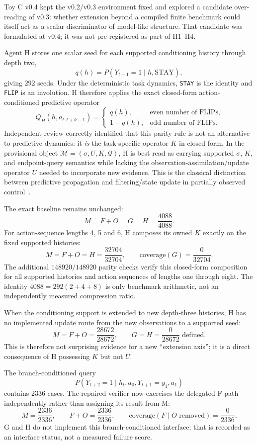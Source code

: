 \documentclass[10pt]{article}
\begin{document}
Toy C v0.4 kept the v0.2/v0.3 environment fixed and explored a candidate over-reading of v0.3: whether extension beyond a compiled finite benchmark could itself act as a scalar discriminator of model-like structure. That candidate was formulated at v0.4; it was not pre-registered as part of H1--H4.

Agent H stores one scalar seed for each supported conditioning history through depth two,
\[
q(h)=P(Y_{t+1}=1\mid h,\mathrm{STAY}),
\]
giving 292 seeds. Under the deterministic task dynamics, \texttt{STAY} is the identity and \texttt{FLIP} is an involution. H therefore applies the exact closed-form action-conditioned predictive operator
\[
Q_H(h,a_{t:t+k-1})=
\begin{cases}
q(h), & \text{even number of FLIPs},\\
1-q(h), & \text{odd number of FLIPs}.
\end{cases}
\]
Independent review correctly identified that this parity rule is not an alternative to predictive dynamics: it \emph{is} the task-specific operator $K$ in closed form. In the provisional object $\mathcal M=(\sigma,U,K,\mathcal Q)$, H is best read as carrying supported $\sigma$, $K$, and endpoint-query semantics while lacking the observation-assimilation/update operator $U$ needed to incorporate new evidence. This is the classical distinction between predictive propagation and filtering/state update in partially observed control~\cite{astrom1965,striebel1965}.

The exact baseline remains unchanged:
\[
M=F+O=G=H=\frac{4088}{4088}.
\]
For action-sequence lengths 4, 5 and 6, H composes its owned $K$ exactly on the fixed supported histories:
\[
M=F+O=H=\frac{32704}{32704},
\qquad
\mathrm{coverage}(G)=\frac{0}{32704}.
\]
The additional $148920/148920$ parity checks verify this closed-form composition for all supported histories and action sequences of lengths one through eight. The identity $4088=292(2+4+8)$ is only benchmark arithmetic, not an independently measured compression ratio.

When the conditioning support is extended to new depth-three histories, H has no implemented update route from the new observations to a supported seed:
\[
M=F+O=\frac{28672}{28672},
\qquad
G=H=\frac{0}{28672}\text{ defined}.
\]
This is therefore not surprising evidence for a new ``extension axis''; it is a direct consequence of H possessing $K$ but not $U$.

The branch-conditioned query
\[
P(Y_{t+2}=1\mid h_t,a_0,Y_{t+1}=y_1,a_1)
\]
contains 2336 cases. The repaired verifier now exercises the delegated F path independently rather than assigning its result from M:
\[
M=\frac{2336}{2336},
\qquad
F+O=\frac{2336}{2336},
\qquad
\mathrm{coverage}(F\mid O\text{ removed})=\frac{0}{2336}.
\]
G and H do not implement this branch-conditioned interface; that is recorded as an interface status, not a measured failure score.
\end{document}
